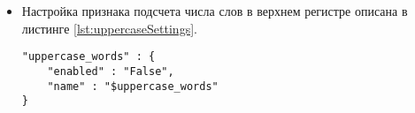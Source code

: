 \begin{itemize}
        \item Настройка признака подсчета числа слов в верхнем регистре описана в
            листинге \ref{lst:uppercaseSettings}.
        \begin{lstlisting}[caption="Настройка признака подсчета числа слов в верхнем регистре", label={lst:uppercaseSettings}]
"uppercase_words" : {
    "enabled" : "False",
    "name" : "$uppercase_words"
}
        \end{lstlisting}

    \end{itemize}


%
%        
%
%
